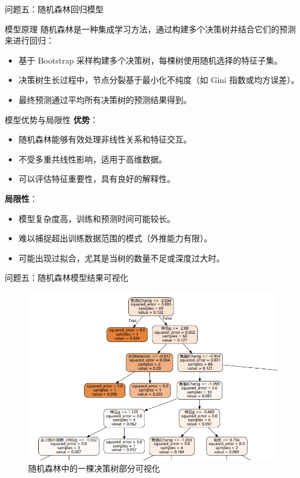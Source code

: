 \documentclass{beamer}
\begin{document}
\begin{frame}{问题五：随机森林回归模型}
    \scriptsize
    \begin{block}{模型原理}
        随机森林是一种集成学习方法，通过构建多个决策树并结合它们的预测来进行回归：
        \begin{itemize}
            \item 基于 Bootstrap 采样构建多个决策树，每棵树使用随机选择的特征子集。
            \item 决策树生长过程中，节点分裂基于最小化不纯度（如 Gini 指数或均方误差）。
            \item 最终预测通过平均所有决策树的预测结果得到。
        \end{itemize}
    \end{block}
    \begin{block}{模型优势与局限性}
        \textbf{优势}：
        \begin{itemize}
            \item 随机森林能够有效处理非线性关系和特征交互。
            \item 不受多重共线性影响，适用于高维数据。
            \item 可以评估特征重要性，具有良好的解释性。
        \end{itemize}
        \textbf{局限性}：
        \begin{itemize}
            \item 模型复杂度高，训练和预测时间可能较长。
            \item 难以捕捉超出训练数据范围的模式（外推能力有限）。
            \item 可能出现过拟合，尤其是当树的数量不足或深度过大时。
        \end{itemize}
    \end{block}
\end{frame}

\begin{frame}{问题五：随机森林模型结果可视化}
    \scriptsize
    \begin{figure}
        \centering
        \includegraphics[width=0.8\linewidth]{pic/决策树.png}
        \caption{随机森林中的一棵决策树部分可视化}
        \label{fig:treevis}
    \end{figure}
\end{frame}
\end{document}
